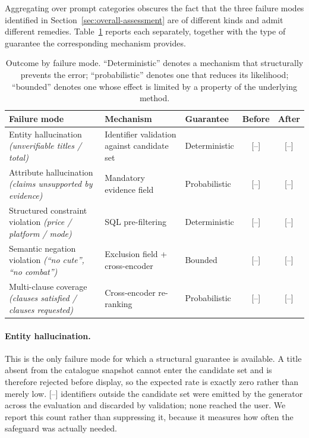 Aggregating over prompt categories obscures the fact that the three failure
modes identified in Section~\ref{sec:overall-assessment} are of different kinds
and admit different remedies. Table~\ref{tab:failure-mode-outcomes} reports each
separately, together with the type of guarantee the corresponding mechanism
provides.

\begin{table}[h]
\centering
\caption{Outcome by failure mode. ``Deterministic'' denotes a mechanism that
structurally prevents the error; ``probabilistic'' denotes one that reduces its
likelihood; ``bounded'' denotes one whose effect is limited by a property of the
underlying method.}
\label{tab:failure-mode-outcomes}
\small
\begin{tabular}{p{3.1cm}p{3.0cm}p{2.0cm}cc}
\hline
\textbf{Failure mode} & \textbf{Mechanism} & \textbf{Guarantee} &
\textbf{Before} & \textbf{After} \\
\hline
Entity hallucination \newline \emph{(unverifiable titles / total)}
& Identifier validation against candidate set
& Deterministic
& [--] & [--] \\[2pt]

Attribute hallucination \newline \emph{(claims unsupported by evidence)}
& Mandatory evidence field
& Probabilistic
& [--] & [--] \\[2pt]

Structured constraint violation \newline \emph{(price / platform / mode)}
& SQL pre-filtering
& Deterministic
& [--] & [--] \\[2pt]

Semantic negation violation \newline \emph{(``no cute'', ``no combat'')}
& Exclusion field + cross-encoder
& Bounded
& [--] & [--] \\[2pt]

Multi-clause coverage \newline \emph{(clauses satisfied / clauses requested)}
& Cross-encoder re-ranking
& Probabilistic
& [--] & [--] \\
\hline
\end{tabular}
\end{table}

\paragraph{Entity hallucination.}
This is the only failure mode for which a structural guarantee is available. A
title absent from the catalogue snapshot cannot enter the candidate set and is
therefore rejected before display, so the expected rate is exactly zero rather
than merely low. [--] identifiers outside the candidate set were emitted by the
generator across the evaluation and discarded by validation; none reached the
user. We report this count rather than suppressing it, because it measures how
often the safeguard was actually needed.

